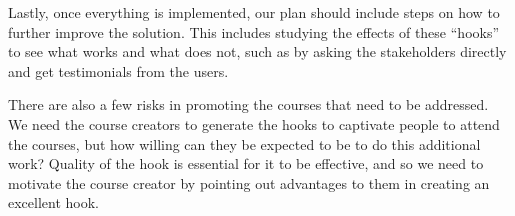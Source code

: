 Lastly, once everything is implemented, our plan should include steps on how to further improve the solution. This includes studying the effects of these “hooks” to see what works and what does not, such as by asking the stakeholders directly and get testimonials from the users.

There are also a few risks in promoting the courses that need to be addressed. We need the course creators to generate the hooks to captivate people to attend the courses, but how willing can they be expected to be to do this additional work? Quality of the hook is essential for it to be effective, and so we need to motivate the course creator by pointing out advantages to them in creating an excellent hook.


